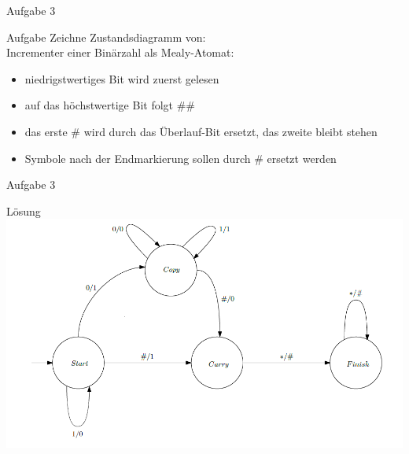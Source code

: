 \documentclass{beamer}
\begin{document}
    \begin{frame}{Aufgabe 3}{}
        \begin{block}{Aufgabe}
            Zeichne Zustandsdiagramm von:\\
            Incrementer einer Binärzahl als Mealy-Atomat:
            \begin{itemize}
                \item niedrigstwertiges Bit wird zuerst gelesen
                \item auf das höchstwertige Bit folgt $\#\#$
                \item das erste $\#$ wird durch das Überlauf-Bit ersetzt, das zweite bleibt stehen
                \item Symbole nach der Endmarkierung sollen durch $\#$ ersetzt werden
            \end{itemize}
        \end{block}
    \end{frame}

    \begin{frame}{Aufgabe 3}
        \begin{block}{Lösung}
            \includegraphics[scale=0.4]{./figures/Mealy-Increment.png}
        \end{block}
    \end{frame}
\end{document}
